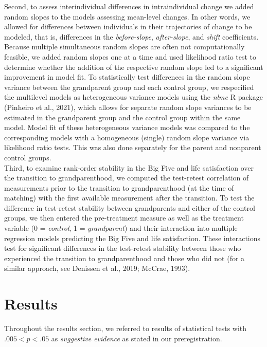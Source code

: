 \documentclass[
  english,
  man, noextraspace]{apa7}
\begin{document}
Second, to assess interindividual differences in intraindividual change we added random slopes to the models assessing mean-level changes. In other words, we allowed for differences between individuals in their trajectories of change to be modeled, that is, differences in the \emph{before-slope}, \emph{after-slope}, and \emph{shift} coefficients. Because multiple simultaneous random slopes are often not computationally feasible, we added random slopes one at a time and used likelihood ratio test to determine whether the addition of the respective random slope led to a significant improvement in model fit. To statistically test differences in the random slope variance between the grandparent group and each control group, we respecified the multilevel models as heterogeneous variance models using the \emph{nlme} R package (Pinheiro et al., 2021), which allows for separate random slope variances to be estimated in the grandparent group and the control group within the same model. Model fit of these heterogeneous variance models was compared to the corresponding models with a homogeneous (single) random slope variance via likelihood ratio tests. This was also done separately for the parent and nonparent control groups.\\
Third, to examine rank-order stability in the Big Five and life satisfaction over the transition to grandparenthood, we computed the test-retest correlation of measurements prior to the transition to grandparenthood (at the time of matching) with the first available measurement after the transition. To test the difference in test-retest stability between grandparents and either of the control groups, we then entered the pre-treatment measure as well as the treatment variable (0 = \emph{control}, 1 = \emph{grandparent}) and their interaction into multiple regression models predicting the Big Five and life satisfaction. These interactions test for significant differences in the test-retest stability between those who experienced the transition to grandparenthood and those who did not (for a similar approach, see Denissen et al., 2019; McCrae, 1993).

\hypertarget{results}{%
\section{Results}\label{results}}

Throughout the results section, we referred to results of statistical tests with \(.005 < p < .05\) as \emph{suggestive evidence} as stated in our preregistration.
\end{document}
